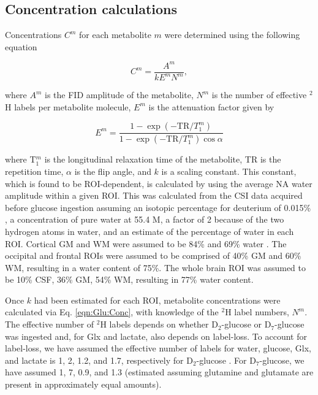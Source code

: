 \subsection{Concentration calculations}
\label{Chap:Glu:conc}

Concentrations $C^m$ for each metabolite $m$ were determined using the following equation

\begin{equation}
    C^m = \frac{A^m}{kE^mN^m},
    \label{eqn:Glu:Conc}
\end{equation}

where $A^m$ is the FID amplitude of the metabolite, $N^m$ is the number of effective $^2$H labels per metabolite molecule, $E^m$ is the attenuation factor given by

\begin{equation}
    E^m = \frac{1-\exp(-\text{TR}/T_1^m)}{1-\exp(-\text{TR}/T_1^m)\cos{\alpha}}
    \label{eqn:Glu:Atte}
\end{equation}

where T$_1^m$ is the longitudinal relaxation time of the metabolite, TR is the repetition time, $\alpha$ is the flip angle, and $k$ is a scaling constant. This constant, which is found to be \ac{ROI}-dependent, is calculated by using the average \ac{NA} water amplitude within a given \ac{ROI}. This was calculated from the \ac{CSI} data acquired before glucose ingestion assuming an isotopic percentage for deuterium of 0.015\% \cite{Hagemann1970AbsoluteSMOW}, a concentration of pure water at 55.4 M, a factor of 2 because of the two hydrogen atoms in water, and an estimate of the percentage of water in each \ac{ROI}. Cortical \ac{GM} and \ac{WM} were assumed to be 84\% and 69\% water \cite{Oros-Peusquens2019AImplications}. The occipital and frontal \ac{ROI}s were assumed to be comprised of 40\% \ac{GM} and 60\% \ac{WM}, resulting in a water content of 75\%. The whole brain \ac{ROI} was assumed to be 10\% \ac{CSF}, 36\% \ac{GM}, 54\% \ac{WM}, resulting in 77\% water content.

Once $k$ had been estimated for each \ac{ROI}, metabolite concentrations were calculated via Eq. \ref{eqn:Glu:Conc}, with knowledge of the $^2$H label numbers, $N^m$. The effective number of $^2$H labels depends on whether D$_2$-glucose or D$_7$-glucose was ingested and, for Glx and lactate, also depends on label-loss. To account for label-loss, we have assumed the effective number of labels for water, glucose, Glx, and lactate is 1, 2, 1.2, and 1.7, respectively for D$_2$-glucose \cite{DeGraaf2021CharacterizationStudies}. For D$_7$-glucose, we have assumed 1, 7, 0.9, and 1.3 (estimated \cite{Funk2017TheGlucose} assuming glutamine and glutamate are present in approximately equal amounts). 

